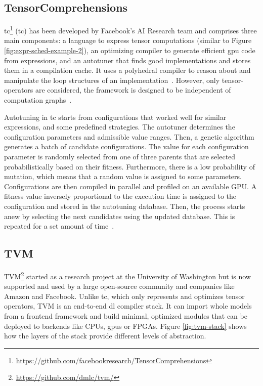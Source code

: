 \subsection{TensorComprehensions}
\acrlong{tc}\footnote{\url{https://github.com/facebookresearch/TensorComprehensions}} (\acrshort{tc}) has been developed by Facebook's AI Research team and comprises three main components: a language to express tensor computations (similar to Figure \ref{fig:expr-sched-example-2}), an optimizing compiler to generate efficient \gls{gpu} code from expressions, and an autotuner that finds good implementations and stores them in a compilation cache. It uses a polyhedral compiler to reason about and manipulate the loop structures of an implementation~\cite[p.~3]{Vasilache.2018}. However, only tensor-operators are considered, the framework is designed to be independent of computation graphs~\cite[p.~4]{Vasilache.2018}.

Autotuning in \gls{tc} starts from configurations that worked well for similar expressions, and some predefined strategies. The autotuner determines the configuration parameters and admissible value ranges. Then, a genetic algorithm generates a batch of candidate configurations. The value for each configuration parameter is randomly selected from one of three parents that are selected probabilistically based on their fitness. Furthermore, there is a low probability of mutation, which means that a random value is assigned to some parameters. Configurations are then compiled in parallel and profiled on an available GPU. A fitness value inversely proportional to the execution time is assigned to the configuration and stored in the autotuning database. Then, the process starts anew by selecting the next candidates using the updated database. This is repeated for a set amount of time~\cite[p.~15~f.]{Vasilache.2018}.

\subsection{TVM}
TVM\footnote{\url{https://github.com/dmlc/tvm/}} started as a research project at the University of Washington but is now supported and used by a large open-source community and companies like Amazon and Facebook. Unlike \gls{tc}, which only represents and optimizes tensor operators, TVM is an end-to-end \gls{dl} compiler stack. It can import whole models from a frontend framework and build minimal, optimized modules that can be deployed to backends like CPUs, \glspl{gpu} or FPGAs. Figure \ref{fig:tvm-stack} shows how the layers of the stack provide different levels of abstraction.

